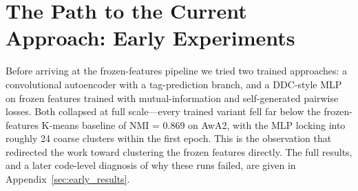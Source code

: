 \section{The Path to the Current Approach: Early Experiments}
\label{sec:early_experiments}

Before arriving at the frozen-features pipeline we tried two trained approaches: a convolutional autoencoder with a tag-prediction branch, and a DDC-style MLP on frozen features trained with mutual-information and self-generated pairwise losses. Both collapsed at full scale---every trained variant fell far below the frozen-features K-means baseline of NMI = 0.869 on AwA2, with the MLP locking into roughly 24 coarse clusters within the first epoch. This is the observation that redirected the work toward clustering the frozen features directly. The full results, and a later code-level diagnosis of why these runs failed, are given in Appendix~\ref{sec:early_results}.